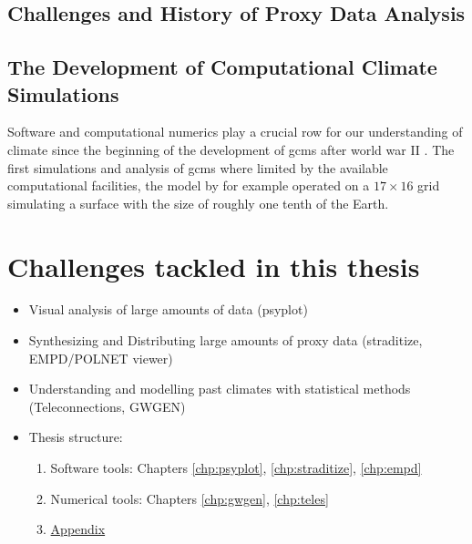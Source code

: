 \begin{refsection}
\subsection{Challenges and History of Proxy Data Analysis} \label{sec:intro-software-data}

\subsection{The Development of Computational Climate Simulations} \label{sec:intro-software-model}
Software and computational numerics play a crucial row for our understanding of climate since the beginning of the development of \glspl{gcm} after world war II \citep{Edwards2010, Phillips1956, Lewis1998}. The first simulations and analysis of \glspl{gcm} where limited by the available computational facilities, the model by \cite{Phillips1956} for example operated on a $17 \times 16$ grid simulating a surface with the size of roughly one tenth of the Earth. 



\section{Challenges tackled in this thesis} \label{sec:intro-thesis-overview}

\begin{itemize}
	\item Visual analysis of large amounts of data (psyplot)
	\item Synthesizing and Distributing large amounts of proxy data (straditize, EMPD/POLNET viewer)
	\item Understanding and modelling past climates with statistical methods (Teleconnections, GWGEN)
	\item Thesis structure:
		\begin{enumerate}
			\item Software tools: Chapters \ref{chp:psyplot}, \ref{chp:straditize}, \ref{chp:empd}
			\item Numerical tools: Chapters \ref{chp:gwgen}, \ref{chp:teles}
			\item \hyperlink{appendix}{Appendix}
		\end{enumerate}
\end{itemize}


\printbibliography[heading=subbibintoc]

\end{refsection}